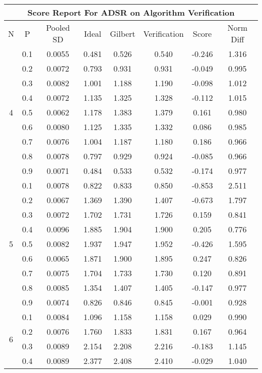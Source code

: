 \documentclass[11pt,a4paper]{report}
\begin{document}
\begin{longtable}{ | c | c || c | c | c | c | c | c | }
\hline
\multicolumn{8}{|c|}{ Score Report For ADSR on Algorithm Verification} \\
\hline
N & P & Pooled SD &  Ideal &  Gilbert & Verification  & Score & Norm Diff \\
 \hline
 \hline
 \endhead
\multirow{9}{*}{4} & 0.1 & 0.0055 & 0.481 & 0.526 & 0.540 & -0.246 & 1.316 \\
 & 0.2 & 0.0072 & 0.793 & 0.931 & 0.931 & -0.049 & 0.995 \\
 & 0.3 & 0.0082 & 1.001 & 1.188 & 1.190 & -0.098 & 1.012 \\
 & 0.4 & 0.0072 & 1.135 & 1.325 & 1.328 & -0.112 & 1.015 \\
 & 0.5 & 0.0062 & 1.178 & 1.383 & 1.379 & 0.161 & 0.980 \\
 & 0.6 & 0.0080 & 1.125 & 1.335 & 1.332 & 0.086 & 0.985 \\
 & 0.7 & 0.0076 & 1.004 & 1.187 & 1.180 & 0.186 & 0.966 \\
 & 0.8 & 0.0078 & 0.797 & 0.929 & 0.924 & -0.085 & 0.966 \\
 & 0.9 & 0.0071 & 0.484 & 0.533 & 0.532 & -0.174 & 0.977 \\
 \hline
\multirow{9}{*}{5} & 0.1 & 0.0078 & 0.822 & 0.833 & 0.850 & -0.853 & 2.511 \\
 & 0.2 & 0.0067 & 1.369 & 1.390 & 1.407 & -0.673 & 1.797 \\
 & 0.3 & 0.0072 & 1.702 & 1.731 & 1.726 & 0.159 & 0.841 \\
 & 0.4 & 0.0096 & 1.885 & 1.904 & 1.900 & 0.205 & 0.776 \\
 & 0.5 & 0.0082 & 1.937 & 1.947 & 1.952 & -0.426 & 1.595 \\
 & 0.6 & 0.0065 & 1.871 & 1.900 & 1.895 & 0.247 & 0.826 \\
 & 0.7 & 0.0075 & 1.704 & 1.733 & 1.730 & 0.120 & 0.891 \\
 & 0.8 & 0.0085 & 1.354 & 1.407 & 1.405 & -0.147 & 0.977 \\
 & 0.9 & 0.0074 & 0.826 & 0.846 & 0.845 & -0.001 & 0.928 \\
 \hline
\multirow{9}{*}{6} & 0.1 & 0.0084 & 1.096 & 1.158 & 1.158 & 0.029 & 0.990 \\
 & 0.2 & 0.0076 & 1.760 & 1.833 & 1.831 & 0.167 & 0.964 \\
 & 0.3 & 0.0089 & 2.154 & 2.208 & 2.216 & -0.183 & 1.145 \\
 & 0.4 & 0.0089 & 2.377 & 2.408 & 2.410 & -0.029 & 1.040 \\

\end{longtable}
\end{document}
